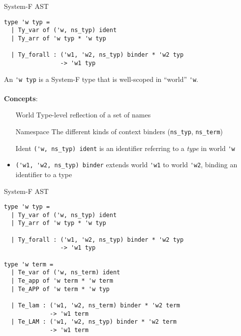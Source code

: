 \documentclass{beamer}          %
\begin{document}
\begin{frame}[fragile]{System-F AST}

\begin{lstlisting}
type 'w typ =
  | Ty_var of ('w, ns_typ) ident
  | Ty_arr of 'w typ * 'w typ

  | Ty_forall : ('w1, 'w2, ns_typ) binder * 'w2 typ
                -> 'w1 typ
\end{lstlisting}

An \lstinline{'w typ} is a System-F type that is well-scoped in ``world'' \lstinline{'w}.
\\ ~ \\
\pause
\textbf{Concepts}:
\begin{itemize}
  \setlength{\itemindent}{1em}
  \item[World] Type-level reflection of a set of names
  \item[Namespace] The different kinds of context binders {\small (\texttt{ns\_typ}, \texttt{ns\_term})}
  \item[Ident] \lstinline{('w, ns_typ) ident} is an identifier referring to a {\em type}
        in world \lstinline{'w}
  \item[Binder] \lstinline{('w1, 'w2, ns_typ) binder} extends world \lstinline{'w1}
        to world \lstinline{'w2}, binding an identifier to a type
\end{itemize}

\end{frame}

\begin{frame}[fragile]{System-F AST}

\begin{lstlisting}
type 'w typ =
  | Ty_var of ('w, ns_typ) ident
  | Ty_arr of 'w typ * 'w typ

  | Ty_forall : ('w1, 'w2, ns_typ) binder * 'w2 typ
                -> 'w1 typ

type 'w term =
  | Te_var of ('w, ns_term) ident
  | Te_app of 'w term * 'w term
  | Te_APP of 'w term * 'w typ

  | Te_lam : ('w1, 'w2, ns_term) binder * 'w2 term
             -> 'w1 term
  | Te_LAM : ('w1, 'w2, ns_typ) binder * 'w2 term
             -> 'w1 term
\end{lstlisting}

\end{frame}
\end{document}
